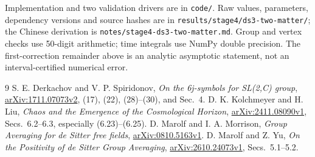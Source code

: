\documentclass[11pt,a4paper]{article}
\begin{document}
Implementation and two validation drivers are in \texttt{code/}.
Raw values, parameters, dependency versions and source hashes are in
\texttt{results/stage4/ds3-two-matter/}; the Chinese derivation is
\texttt{notes/stage4-ds3-two-matter.md}.
Group and vertex checks use 50-digit arithmetic; time integrals use
NumPy double precision. The first-correction remainder above is an
analytic asymptotic statement, not an interval-certified numerical error.

\begin{thebibliography}{9}\small
{}
S. E. Derkachov and V. P. Spiridonov,
\emph{On the 6j-symbols for SL(2,C) group},
\href{https://arxiv.org/html/1711.07073v2}{arXiv:1711.07073v2},
(17), (22), (28)--(30), and Sec.\ 4.
D. K. Kolchmeyer and H. Liu,
\emph{Chaos and the Emergence of the Cosmological Horizon},
\href{https://arxiv.org/html/2411.08090v1}{arXiv:2411.08090v1},
Secs.\ 6.2--6.3, especially (6.23)--(6.25).
D. Marolf and I. A. Morrison,
\emph{Group Averaging for de Sitter free fields},
\href{https://arxiv.org/html/0810.5163v1}{arXiv:0810.5163v1}.
D. Marolf and Z. Yu,
\emph{On the Positivity of de Sitter Group Averaging},
\href{https://arxiv.org/html/2610.24073v1}{arXiv:2610.24073v1},
Secs.\ 5.1--5.2.
\end{thebibliography}
\end{document}
